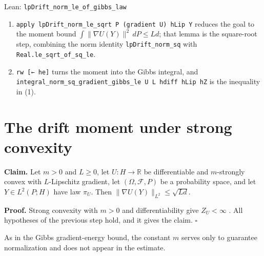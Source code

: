 \documentclass[11pt,a4paper]{article}
\begin{document}
\begin{leanbox}{Lean: \texttt{lpDrift\_\allowbreak{}norm\_\allowbreak{}le\_\allowbreak{}of\_\allowbreak{}gibbs\_\allowbreak{}law}}
\begin{enumerate}
\item \texttt{apply lp\allowbreak{}Drift\_\allowbreak{}norm\_\allowbreak{}le\_\allowbreak{}sqrt P (gradient U) h\allowbreak{}Lip Y} reduces the goal to the moment bound \(\int\|\nabla U(Y)\|^2\,dP\le Ld\); that lemma is the square-root step, combining the norm identity \texttt{lp\allowbreak{}Drift\_\allowbreak{}norm\_\allowbreak{}sq} with \texttt{Real.\allowbreak{}le\_\allowbreak{}sqrt\_\allowbreak{}of\_\allowbreak{}sq\_\allowbreak{}le}.

\item \texttt{rw [← he]} turns the moment into the Gibbs integral, and \texttt{integral\_\allowbreak{}norm\_\allowbreak{}sq\_\allowbreak{}gradient\_\allowbreak{}gibbs\_\allowbreak{}le U L hdiff h\allowbreak{}Lip h\allowbreak{}Z} is the inequality in (1).

\end{enumerate}
\end{leanbox}

\section{\texorpdfstring{The drift moment under strong convexity}{The drift moment under strong convexity}}


\textbf{Claim.} Let \(m>0\) and \(L\ge0\), let \(U:H\to\mathbb R\) be differentiable and \(m\)-strongly convex with \(L\)-Lipschitz gradient, let \((\Omega,\mathcal F,P)\) be a probability space, and let \(Y\in L^2(P;H)\) have law \(\pi_U\). Then \(\|\nabla U(Y)\|_{L^2}\le\sqrt{Ld}\).




\textbf{Proof.} Strong convexity with \(m>0\) and differentiability give \(Z_U<\infty\) \cite[Section~3.26.10]{LangevinLean2026ULASC}. All hypotheses of the previous step hold, and it gives the claim. \(\square\)




As in the Gibbs gradient-energy bound, the constant \(m\) serves only to guarantee normalization and does not appear in the estimate.
\end{document}
